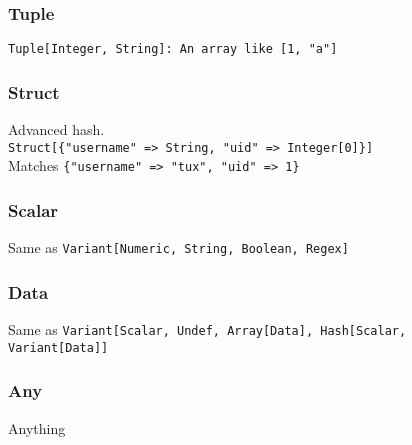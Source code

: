 \begin{frame}\frametitle{Tuple}
    \begin{center}
\LARGE
\texttt{Tuple[Integer, String]: An array like [1, "a"]}
    \end{center}
\end{frame}
\begin{frame}\frametitle{Struct}
    \begin{center}
\LARGE
Advanced hash.\\
\texttt{Struct[\{"username" => String, "uid" => Integer[0]\}]}\\
Matches \texttt{\{"username" => "tux", "uid" => 1\}}
    \end{center}
\end{frame}
\begin{frame}\frametitle{Scalar}
    \begin{center}
\LARGE
Same as \texttt{Variant[Numeric, String, Boolean, Regex]}
    \end{center}
\end{frame}
\begin{frame}\frametitle{Data}
    \begin{center}
\LARGE
Same as \texttt{Variant[Scalar, Undef, Array[Data], Hash[Scalar, Variant[Data]]}
    \end{center}
\end{frame}
\begin{frame}\frametitle{Any}
    \begin{center}
\LARGE
Anything
    \end{center}
\end{frame}
